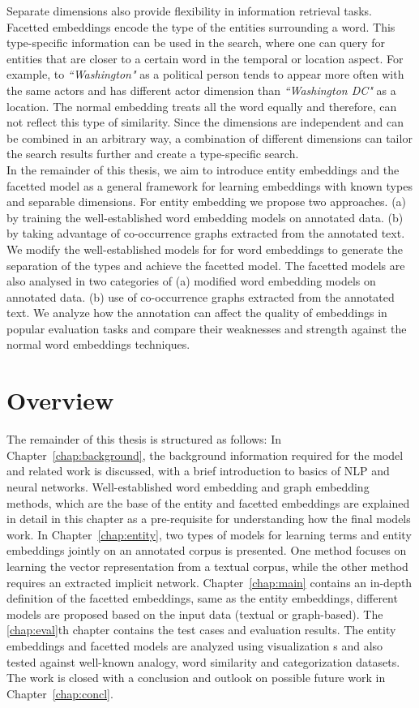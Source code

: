 Separate dimensions also provide flexibility in information retrieval tasks. Facetted embeddings encode the type of the entities surrounding a word. This type-specific information can be used in the search, where one can query for entities that are closer to a certain word in the temporal or location aspect. For example, to \emph{``Washington"} as a political person tends to appear more often with the same actors and has different actor dimension than \emph{``Washington DC"} as a location. The normal embedding treats all the word equally and therefore, can not reflect this type of similarity. Since the dimensions are independent and can be combined in an arbitrary way, a combination of different dimensions can tailor the search results further and create a type-specific search.  \\
In the remainder of this thesis, we aim to introduce entity embeddings and the facetted model as a general framework for learning embeddings with known types and separable dimensions. For entity embedding we propose two approaches. (a) by training the well-established word embedding models on annotated data. (b) by taking advantage of co-occurrence graphs extracted from the annotated text. We modify the well-established models for for word embeddings to generate the separation of the types and achieve the facetted model. The facetted models are also analysed in two categories of (a) modified word embedding models on annotated data. (b) use of co-occurrence graphs extracted from the annotated text. We analyze how the annotation can affect the quality of embeddings in popular evaluation tasks and compare their weaknesses and strength against the normal word embeddings techniques. 

\section{Overview}
The remainder of this thesis is structured as follows: In Chapter~\ref{chap:background}, the background information required for the model and related work is discussed, with a brief introduction to basics of NLP and neural networks. Well-established word embedding and graph embedding methods, which are the base of the entity and facetted embeddings are explained in detail in this chapter as a pre-requisite for understanding how the final models work. In Chapter~\ref{chap:entity}, two types of models for learning terms and entity embeddings jointly on an annotated corpus is presented. One method focuses on learning the vector representation from a textual corpus, while the other method requires an extracted implicit network. Chapter~\ref{chap:main} contains an in-depth definition of the facetted embeddings, same as the entity embeddings, different models are proposed based on the input data (textual or graph-based). The \ref{chap:eval}th chapter contains the test cases and evaluation results. The entity embeddings and facetted models are analyzed using visualization s and also tested against well-known analogy, word similarity and categorization datasets. The work is closed with a conclusion and outlook on possible future work in Chapter~\ref{chap:concl}. 




